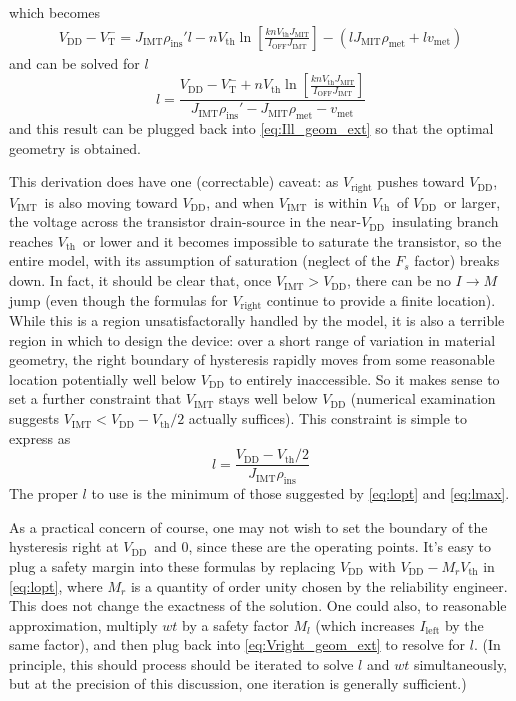 \documentclass[letterpaper]{article}
\newcommand{\VTm}{\ensuremath{V_\mathrm{T}^-}}
\newcommand{\VDD}{\ensuremath{V_\mathrm{DD}}}
\newcommand{\Vth}{\ensuremath{V_\mathrm{th}}}
\newcommand{\VIMT}{\ensuremath{V_\mathrm{IMT}}}
\newcommand{\vmet}{\ensuremath{v_\mathrm{met}}}
\newcommand{\IOFF }{\ensuremath{I_\mathrm{OFF}}}
\newcommand{\pins}{\ensuremath{\rho_\mathrm{ins}}}
\newcommand{\pmet}{\ensuremath{\rho_\mathrm{met}}}
\newcommand{\pinsp}{\ensuremath{\rho_\mathrm{ins}'}}
\begin{document}
which becomes
\begin{multline*}
  V_\mathrm{DD}-\VTm=J_\mathrm{IMT}\pinsp l-n\Vth \ln\left[ \frac{kn\Vth J_\mathrm{MIT}}{ \IOFF J_\mathrm{IMT}} \right]
  -\left( lJ_\mathrm{MIT}\pmet+l\vmet \right)
\end{multline*}
and can be solved for $l$
\begin{equation}
  l=\frac{V_\mathrm{DD}-\VTm+n\Vth \ln\left[ \frac{kn\Vth J_\mathrm{MIT}}{ \IOFF J_\mathrm{IMT}} \right]}{J_\mathrm{IMT}\pinsp - J_\mathrm{MIT}\pmet-\vmet}
  \label{eq:lopt}
\end{equation}
and this result can be plugged back into \eqref{eq:Ill_geom_ext} so that the optimal geometry is obtained.

This derivation does have one (correctable) caveat: as $V_\mathrm{right}$ pushes toward \VDD, \VIMT\ is also moving toward \VDD, and when \VIMT\ is within \Vth\ of \VDD\ or larger, the voltage across the transistor drain-source in the near-\VDD\ insulating branch reaches \Vth\ or lower and it becomes impossible to saturate the transistor, so the entire model, with its assumption of saturation (neglect of the $F_s$ factor) breaks down.  In fact, it should be clear that, once $\VIMT>\VDD$, there can be no $I\rightarrow M$ jump (even though the formulas for $V_\mathrm{right}$ continue to provide a finite location).  While this is a region unsatisfactorally handled by the model, it is also a terrible region in which to design the device: over a short range of variation in material geometry, the right boundary of hysteresis rapidly moves from some reasonable location potentially well below $\VDD$ to entirely inaccessible.  So it makes sense to set a further constraint that $\VIMT$ stays well below $\VDD$ (numerical examination suggests $\VIMT < \VDD - \Vth/2$ actually suffices).  This constraint is simple to express as
\begin{equation}
  l=\frac{\VDD-\Vth/2}{J_\mathrm{IMT}\pins}
  \label{eq:lmax}
\end{equation}
The proper $l$ to use is the minimum of those suggested by \eqref{eq:lopt} and \eqref{eq:lmax}.

As a practical concern of course, one may not wish to set the boundary of the hysteresis right at \VDD\ and 0, since these are the operating points.  It's easy to plug a safety margin into these formulas by replacing $\VDD$ with $\VDD-M_r\Vth$ in \eqref{eq:lopt}, where $M_r$ is a quantity of order unity chosen by the reliability engineer.  This does not change the exactness of the solution.  One could also, to reasonable approximation, multiply $wt$ by a safety factor $M_l$ (which increases $I_\mathrm{left}$ by the same factor), and then plug back into \eqref{eq:Vright_geom_ext} to resolve for $l$.  (In principle, this should process should be iterated to solve $l$ and $wt$ simultaneously, but at the precision of this discussion, one iteration is generally sufficient.)
\end{document}
